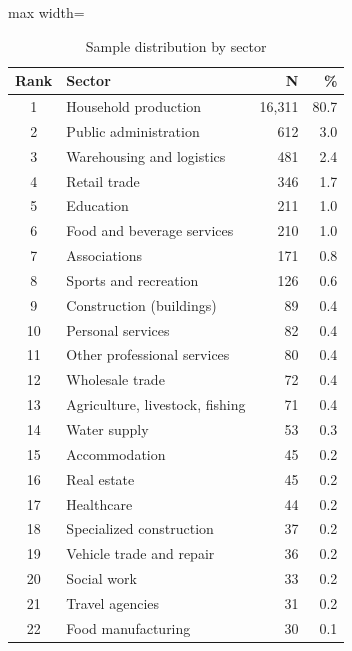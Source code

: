 ﻿\documentclass[12pt,reqno, twoside]{amsbook}
\numberwithin{figure}{chapter}
\numberwithin{table}{chapter}
\numberwithin{equation}{chapter}
\theoremstyle{plain}
\numberwithin{equation}{chapter}
\numberwithin{section}{chapter}
\begin{document}
\begin{table}[htbp]
\centering
\caption{Sample distribution by sector}
\label{tab:sector_distribution}
\small
\begin{adjustbox}{max width=\textwidth}
\begin{tabular}{clrr}
\toprule
\textbf{Rank} & \textbf{Sector} & \textbf{N} & \textbf{\%} \\
\midrule
1  & Household production                  & 16{,}311 & 80.7 \\
2  & Public administration                 &    612   &  3.0 \\
3  & Warehousing and logistics             &    481   &  2.4 \\
4  & Retail trade                          &    346   &  1.7 \\
5  & Education                             &    211   &  1.0 \\
6  & Food and beverage services            &    210   &  1.0 \\
7  & Associations                          &    171   &  0.8 \\
8  & Sports and recreation                 &    126   &  0.6 \\
9  & Construction (buildings)              &     89   &  0.4 \\
10 & Personal services                     &     82   &  0.4 \\
11 & Other professional services           &     80   &  0.4 \\
12 & Wholesale trade                       &     72   &  0.4 \\
13 & Agriculture, livestock, fishing       &     71   &  0.4 \\
14 & Water supply                          &     53   &  0.3 \\
15 & Accommodation                         &     45   &  0.2 \\
16 & Real estate                           &     45   &  0.2 \\
17 & Healthcare                            &     44   &  0.2 \\
18 & Specialized construction              &     37   &  0.2 \\
19 & Vehicle trade and repair              &     36   &  0.2 \\
20 & Social work                           &     33   &  0.2 \\
21 & Travel agencies                       &     31   &  0.2 \\
22 & Food manufacturing                    &     30   &  0.1 \\

\end{tabular}
\end{adjustbox}
\end{table}
\end{document}

